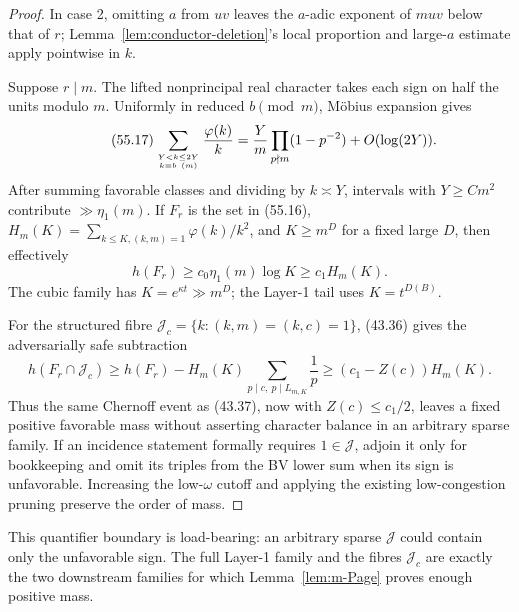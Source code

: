 \documentclass[10pt,reqno]{amsart}
\theoremstyle{definition}
\newcommand{\1}{\mathbf 1}
\begin{document}
\begin{proof}
In case 2, omitting $a$ from $uv$ leaves the $a$-adic exponent of $muv$
below that of $r$; Lemma~\ref{lem:conductor-deletion}'s local proportion
and large-$a$ estimate apply pointwise in $k$.

Suppose $r\mid m$.  The lifted nonprincipal real character takes each sign
on half the units modulo $m$.  Uniformly in reduced $b\pmod m$, M\"obius
expansion gives
\begin{equation}\tag{55.17}
 \sum_{Y<k\leq2Y\atop k\equiv b\ (m)}\frac{\varphi(k)}k
 =\frac Ym\prod_{p\nmid m}(1-p^{-2})+O(\log(2Y)).
\end{equation}
After summing favorable classes and dividing by $k\asymp Y$, intervals with
$Y\geq Cm^2$ contribute $\gg\eta_1(m)$.  If $F_r$ is the set in (55.16),
$H_m(K)=\sum_{k\leq K,(k,m)=1}\varphi(k)/k^2$, and $K\geq m^D$ for a fixed
large $D$, then effectively
\begin{equation}\tag{55.17a}
 h(F_r)\geq c_0\eta_1(m)\log K\geq c_1H_m(K).
\end{equation}
The cubic family has $K=e^{\kappa t}\gg m^D$; the Layer-1 tail uses
$K=t^{D(B)}$.

For the structured fibre
$\mathcal J_c=\{k:(k,m)=(k,c)=1\}$, (43.36) gives the adversarially safe
subtraction
\begin{equation}\tag{55.17b}
 h(F_r\cap\mathcal J_c)
 \geq h(F_r)-H_m(K)
  \sum_{p\mid c,\ p\mid L_{m,K}}\frac1p
 \geq(c_1-Z(c))H_m(K).
\end{equation}
Thus the same Chernoff event as (43.37), now with $Z(c)\leq c_1/2$, leaves
a fixed positive favorable mass without asserting character balance in an
arbitrary sparse family.  If an incidence statement formally requires
$1\in\mathcal J$, adjoin it only for bookkeeping and omit its triples from
the BV lower sum when its sign is unfavorable.  Increasing the low-$\omega$
cutoff and applying the existing low-congestion pruning preserve the order
of mass.
\end{proof}

This quantifier boundary is load-bearing: an arbitrary sparse
$\mathcal J$ could contain only the unfavorable sign.  The full Layer-1
family and the fibres $\mathcal J_c$ are exactly the two downstream families
for which Lemma~\ref{lem:m-Page} proves enough positive mass.
\end{document}
